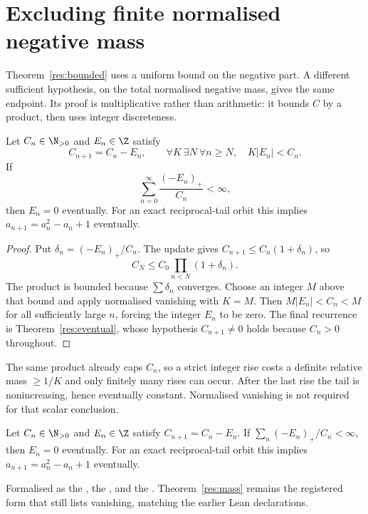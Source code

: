 \section{Excluding finite normalised negative mass}\label{sec:mass}

Theorem~\ref{res:bounded} uses a uniform bound on the negative part.  A different sufficient hypothesis, on the total normalised negative mass,
gives the same endpoint.  Its proof is multiplicative rather than arithmetic:
it bounds $C$ by a product, then uses integer discreteness.

\begin{theorem}\label{res:mass}
Let \(C_n\in\N_{>0}\) and \(E_n\in\Z\) satisfy
\[
 C_{n+1}=C_n-E_n,\qquad
 \forall K\ \exists N\ \forall n\ge N,\quad K|E_n|<C_n .
\]
If
\[
 \sum_{n=0}^{\infty}\frac{(-E_n)_+}{C_n}<\infty ,
\]
then \(E_n=0\) eventually.  For an exact reciprocal-tail orbit this implies
\(a_{n+1}=a_n^2-a_n+1\) eventually.
\end{theorem}

\begin{proof}
Put \(\delta_n=(-E_n)_+/C_n\).  The update gives
\(C_{n+1}\le C_n(1+\delta_n)\), so
\[
 C_N\le C_0\prod_{n<N}(1+\delta_n).
\]
The product is bounded because \(\sum\delta_n\) converges.  Choose an integer
\(M\) above that bound and apply normalised vanishing with \(K=M\).  Then
\(M|E_n|<C_n<M\) for all sufficiently large \(n\), forcing the integer
\(E_n\) to be zero.  The final recurrence is Theorem~\ref{res:eventual}, whose
hypothesis $C_{n+1}\ne0$ holds because $C_n>0$ throughout.
\end{proof}

\noindent The same product already caps $C_n$, so a strict integer rise costs a
definite relative mass $\ge 1/K$ and only finitely many rises can occur.  After
the last rise the tail is nonincreasing, hence eventually constant.  Normalised
vanishing is not required for that scalar conclusion.

\begin{lemma}\label{res:massscalar}
Let \(C_n\in\N_{>0}\) and \(E_n\in\Z\) satisfy \(C_{n+1}=C_n-E_n\).  If
\(\sum_n(-E_n)_+/C_n<\infty\), then \(E_n=0\) eventually.  For an exact
reciprocal-tail orbit this implies \(a_{n+1}=a_n^2-a_n+1\) eventually.
\end{lemma}

\noindent Formalised as the
, the
, and the
.  Theorem~\ref{res:mass} remains the registered
form that still lists vanishing, matching the earlier Lean declarations.

